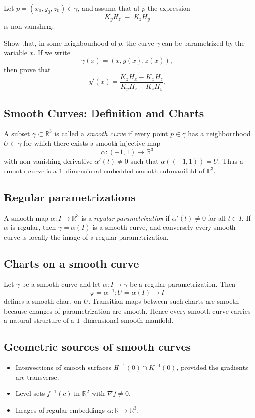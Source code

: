 \documentclass[12pt,a4paper]{article}
\theoremstyle{plain}
\theoremstyle{definition}      %
\begin{document}
	Let $p = (x_0,y_0,z_0) \in \gamma$, and assume that at $p$ the expression
	\[
	K_y H_z \;-\; K_z H_y
	\]
	is non-vanishing.
	
	Show that, in some neighbourhood of $p$, the curve $\gamma$ can be parametrized
	by the variable $x$.  If we write
	\[
	\gamma(x) = (x, y(x), z(x)),
	\]
	then prove that
	\[
	y'(x)
	= \frac{K_z H_x - K_x H_z}{K_y H_z - K_z H_y}.
	\]
	
	\bigskip
	
	
	\subsection*{Smooth Curves: Definition and Charts}
	
	A subset $\gamma \subset \mathbb{R}^3$ is called a \emph{smooth curve} if
	every point $p\in\gamma$ has a neighbourhood $U\subset\gamma$ for which there
	exists a smooth injective map
	\[
	\alpha : (-1,1) \longrightarrow \mathbb{R}^3
	\]
	with non-vanishing derivative $\alpha'(t)\neq 0$ such that
	$\alpha((-1,1)) = U$.
	Thus a smooth curve is a $1$--dimensional embedded smooth submanifold of
	$\mathbb{R}^3$.
	
	\subsection*{Regular parametrizations}
	A smooth map $\alpha : I \to \mathbb{R}^3$ is a \emph{regular
		parametrization} if $\alpha'(t)\neq 0$ for all $t\in I$.
	If $\alpha$ is regular, then $\gamma=\alpha(I)$ is a smooth curve, and
	conversely every smooth curve is locally the image of a regular parametrization.
	
	\subsection*{Charts on a smooth curve}
	Let $\gamma$ be a smooth curve and let
	$\alpha : I \to \gamma$ be a regular parametrization.
	Then
	\[
	\varphi = \alpha^{-1} : U=\alpha(I) \to I
	\]
	defines a smooth chart on $U$.
	Transition maps between such charts are smooth because changes of
	parametrization are smooth.
	Hence every smooth curve carries a natural structure of a $1$--dimensional
	smooth manifold.
	
	\subsection*{Geometric sources of smooth curves}
	\begin{itemize}
		\item Intersections of smooth surfaces $H^{-1}(0)\cap K^{-1}(0)$,
		provided the gradients are transverse.
		\item Level sets $f^{-1}(c)$ in $\mathbb{R}^2$ with $\nabla f \neq 0$.
		\item Images of regular embeddings $\alpha : \mathbb{R}\to\mathbb{R}^3$.
	\end{itemize}
	
\end{document}

